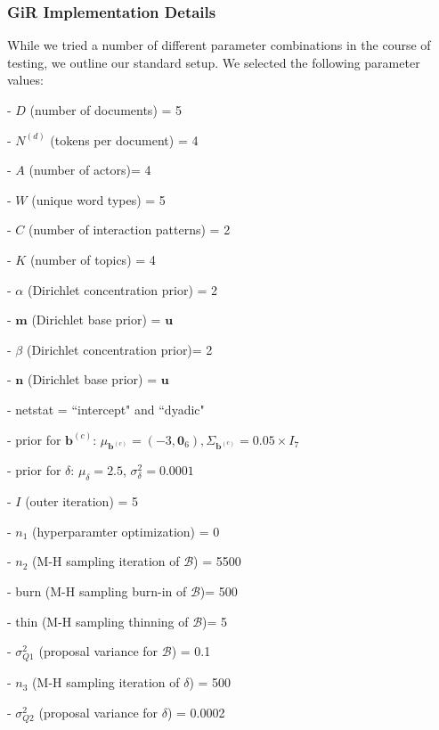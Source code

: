 \documentclass[a4paper]{article}
\begin{document}
        \subsubsection{GiR Implementation Details} \label{subsubsec: GiR implementation}
        While we tried a number of different parameter combinations in the course of testing, we outline our standard setup. We selected the following parameter values:
        \begin{itemize}
        	\begin{minipage}{0.49\textwidth}
        		\item[-] $D$ (number of documents) = 5
        		\item[-] $N^{(d)}$ (tokens per document) = 4
        		\item[-] $A$ (number of actors)= 4
        		\item[-] $W$ (unique word types) = 5
        		\item[-] $C$ (number of interaction patterns) = 2
        		\item[-] $K$ (number of topics) = 4
        		\item[-] $\alpha$ (Dirichlet concentration prior) = 2
        		\item[-] $\boldsymbol{m}$ (Dirichlet base prior) = $\boldsymbol{u}$ 
        		\item[-] $\beta$ (Dirichlet concentration prior)= 2
        		\item[-] $\boldsymbol{n}$ (Dirichlet base prior) = $\boldsymbol{u}$
        		\item[-] netstat = ``intercept" and ``dyadic"
        	\end{minipage}
        	\begin{minipage}{0.49\textwidth}
        		\item[-] prior for $\boldsymbol{b}^{(c)}$: $\mu_{\boldsymbol{b}^{(c)}} = (-3,\boldsymbol{0}_6), \Sigma_{\boldsymbol{b}^{(c)}} = 0.05\times I_7$
        		\item[-] prior for $\delta$: $\mu_\delta = 2.5$, $\sigma^2_\delta = 0.0001$
        		\item[-] $I$ (outer iteration) = 5
        		\item[-] $n_1$ (hyperparamter optimization) = 0
        		\item[-] $n_2$ (M-H sampling iteration of $\mathcal{B}$) = 5500
        		\item[-] burn (M-H sampling burn-in of $\mathcal{B}$)= 500
        		\item[-] thin (M-H sampling thinning of $\mathcal{B}$)= 5
        		\item[-] $\sigma_{Q1}^2$ (proposal variance for $\mathcal{B}$) = 0.1
        		\item[-] $n_3$ (M-H sampling iteration of $\delta$) = 500
        		\item[-] $\sigma_{Q2}^2$ (proposal variance for $\delta$) = 0.0002
        	\end{minipage}
        \end{itemize}        
\end{document}
